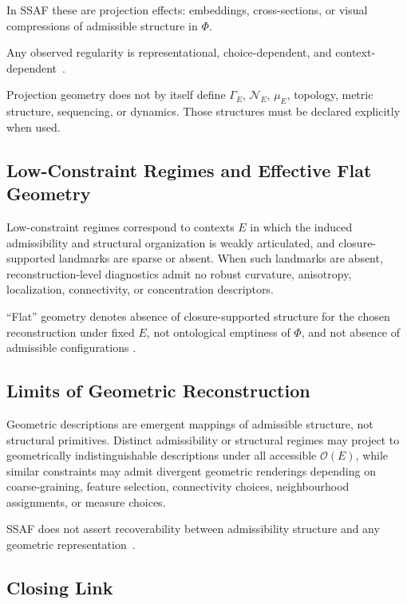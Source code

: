 \documentclass[aps,prx,onecolumn,11pt]{revtex4-2}
\theoremstyle{plain}
\theoremstyle{definition}
\theoremstyle{remark}
\begin{document}
In SSAF these are projection effects: embeddings, cross-sections, or
visual compressions of admissible structure in \(\Phi\).

Any observed regularity is representational, choice-dependent, and
context-dependent~\cite{BengtssonZyczkowski2006,Paris2009,Watrous2018}.

Projection geometry does not by itself define \(\Gamma_E\),
\(\mathcal N_E\), \(\mu_E\), topology, metric structure, sequencing, or
dynamics. Those structures must be declared explicitly when used.

\subsection{Low-Constraint Regimes and Effective Flat Geometry}
\label{subsec:low_constraint_flat_geometry_struct}

Low-constraint regimes correspond to contexts \(E\) in which the
induced admissibility and structural organization is weakly articulated,
and closure-supported landmarks are sparse or absent. When such
landmarks are absent, reconstruction-level diagnostics admit no robust
curvature, anisotropy, localization, connectivity, or concentration
descriptors.

``Flat'' geometry denotes absence of closure-supported structure for the
chosen reconstruction under fixed \(E\), not ontological emptiness of
\(\Phi\), and not absence of admissible configurations
\cite{Peebles2001,BondKofmanPogosyan1996,Sheth2004,vanDeWeygaert2011}.

\subsection{Limits of Geometric Reconstruction}
\label{subsec:limits_reconstruction_struct}

Geometric descriptions are emergent mappings of admissible structure,
not structural primitives. Distinct admissibility or structural regimes
may project to geometrically indistinguishable descriptions under all
accessible \(\mathcal{O}(E)\), while similar constraints may admit
divergent geometric renderings depending on coarse-graining, feature
selection, connectivity choices, neighbourhood assignments, or measure
choices.

SSAF does not assert recoverability between admissibility structure and
any geometric representation~\cite{Wald1984,ButterfieldIsham2001}.

\subsection{Closing Link}
\label{subsec:closing_link_phase_ordering_struct}
\end{document}
